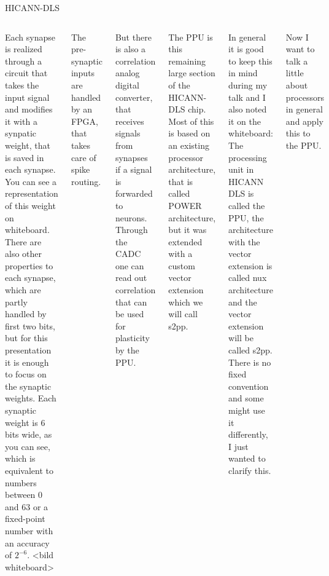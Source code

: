 \documentclass[10pt,aspectratio=169]{beamer}
\begin{document}
\begin{frame}{HICANN-DLS}
\begin{columns}[c]
{        Each synapse is realized through a circuit that takes the input signal and modifies it with a synpatic weight, that is saved in each synapse.
		You can see a representation of this weight on whiteboard.
        There are also other properties to each synapse, which are partly handled by first two bits, but for this presentation it is enough to focus on the synaptic weights.
        Each synaptic weight is 6 bits wide, as you can see, which is equivalent to numbers between 0 and 63 or a fixed-point number with an accuracy of $2^{-6}$.
		<bild whiteboard>
        
        The pre-synaptic inputs are handled by an FPGA, that takes care of spike routing.
        
        But there is also a correlation analog digital converter, that receives signals from synapses if a signal is forwarded to neurons.
        Through the CADC one can read out correlation that can be used for plasticity by the PPU.

        The PPU is this remaining large section of the HICANN-DLS chip.
		Most of this is based on an existing processor architecture, that is called POWER architecture, but it was extended with a custom vector extension which we will call s2pp.

		In general it is good to keep this in mind during my talk and I also noted it on the whiteboard:
		The processing unit in HICANN DLS is called the PPU, the architecture with the vector extension is called nux architecture and the vector extension will be called s2pp.
		There is no fixed convention and some might use it differently, I just wanted to clarify this.

		Now I want to talk a little about processors in general and apply this to the PPU.
}
    \end{columns}
\end{frame}
\end{document}
